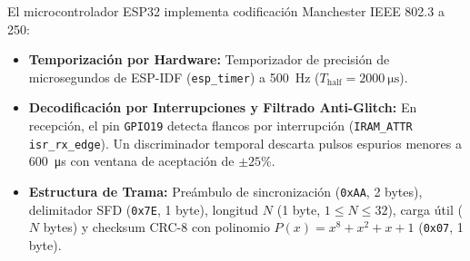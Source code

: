 El microcontrolador ESP32 implementa codificación Manchester IEEE 802.3 a \SI{250}{}:
\begin{itemize}
    \item \textbf{Temporización por Hardware:} Temporizador de precisión de microsegundos de ESP-IDF (\texttt{esp\_timer}) a \SI{500}{\hertz} ($T_{\text{half}} = \SI{2000}{\micro\second}$).
    \item \textbf{Decodificación por Interrupciones y Filtrado Anti-Glitch:} En recepción, el pin \texttt{GPIO19} detecta flancos por interrupción (\texttt{IRAM\_ATTR isr\_rx\_edge}). Un discriminador temporal descarta pulsos espurios menores a \SI{600}{\micro\second} con ventana de aceptación de $\pm 25\%$.
    \item \textbf{Estructura de Trama:} Preámbulo de sincronización (\texttt{0xAA}, 2 bytes), delimitador SFD (\texttt{0x7E}, 1 byte), longitud $N$ (1 byte, $1 \le N \le 32$), carga útil ($N$ bytes) y checksum CRC-8 con polinomio $P(x) = x^8 + x^2 + x + 1$ (\texttt{0x07}, 1 byte).
\end{itemize}
